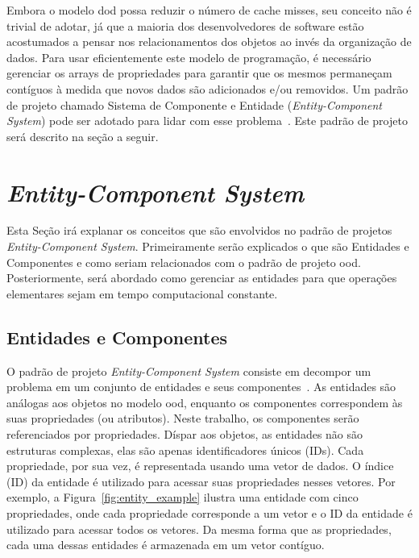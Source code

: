 Embora o modelo \ac{dod} possa reduzir o número de cache misses, seu conceito não é trivial de adotar, já que a maioria dos desenvolvedores de software estão acostumados a pensar nos relacionamentos dos objetos ao invés da organização de dados. Para usar eficientemente este modelo de programação, é necessário gerenciar os arrays de propriedades para garantir que os mesmos permaneçam contíguos à medida que novos dados são adicionados e/ou removidos. Um padrão de projeto chamado Sistema de Componente e Entidade (\textit{Entity-Component System}) pode ser adotado para lidar com esse problema~\cite{nystrom2014game}. Este padrão de projeto será descrito na seção a seguir.

\section{\textit{Entity-Component System}}
\label{sec:entity_component_system}

Esta Seção irá explanar os conceitos que são envolvidos no padrão de projetos \textit{Entity-Component System}.
Primeiramente serão explicados o que são Entidades e Componentes e como seriam relacionados com o padrão de projeto \ac{ood}.
Posteriormente, será abordado como gerenciar as entidades para que operações elementares sejam em tempo computacional constante.

\subsection{Entidades e Componentes}

O padrão de projeto \textit{Entity-Component System} consiste em decompor um problema em um conjunto de entidades e seus componentes~\cite{nystrom2014game}. As entidades são análogas aos objetos no modelo \ac{ood}, enquanto os componentes correspondem às suas propriedades (ou atributos). Neste trabalho, os componentes serão referenciados por propriedades. Díspar aos objetos, as entidades não são estruturas complexas, elas são apenas identificadores únicos (IDs). Cada propriedade, por sua vez, é representada usando uma vetor de dados. O índice (ID) da entidade é utilizado para acessar suas propriedades nesses vetores. Por exemplo, a Figura~\ref{fig:entity_example} ilustra uma entidade com cinco propriedades, onde cada propriedade corresponde a um vetor e o ID da entidade é utilizado para acessar todos os vetores. Da mesma forma que as propriedades, cada uma dessas entidades é armazenada em um vetor contíguo.

